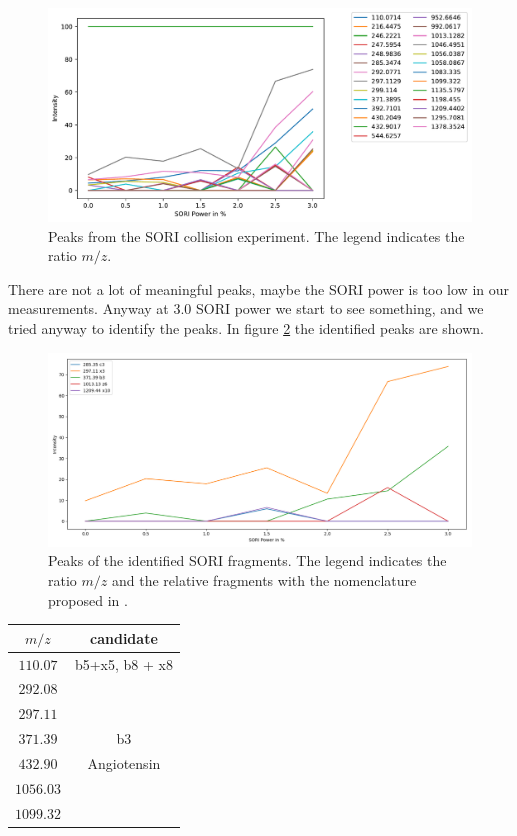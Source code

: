 \documentclass[a4paper,10pt]{article}
\begin{document}
\begin{figure}[H]
	\includegraphics[width = \textwidth]{sori_cid.pdf}
	\caption{Peaks from the SORI collision experiment. The legend indicates the ratio $m/z$.}
	\label{soricollision}
\end{figure}
There are not a lot of meaningful peaks, maybe the SORI power is too low in our measurements. Anyway at 3.0 SORI power we start to see something, and we tried anyway to identify the peaks. In figure \ref{soriidentified} the identified peaks are shown. 

\begin{figure}[H]
	\centering
	\includegraphics[width = \textwidth]{identifiedsori.png}
	\caption{Peaks of the identified SORI fragments. The legend indicates the ratio $m/z$ and the relative fragments with the nomenclature proposed in \cite{fragmentsnomenclature}.}
	\label{soriidentified}
\end{figure}

\begin{table}
	\centering
	\begin{tabular}{c | c}
		$m/z$ & candidate \\ \hline
		$110.07$ & b5+x5, b8 + x8 \\
		$292.08$ & \\
		$297.11$ & \\
		$371.39$ & b3 \\
		$432.90$ & Angiotensin \\
		$1056.03$ & \\
		$1099.32$ & \\
	\end{tabular}
\end{table}
\end{document}
